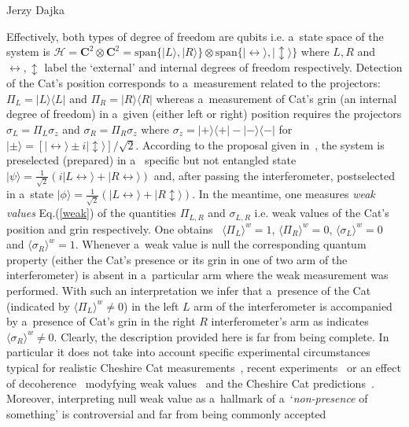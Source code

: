 \begin{artengenv}{Jerzy Dajka}
\begin{figure}
\end{figure}
Effectively, both types of degree of freedom are qubits i.e. a~state space of the  system is
$\mathcal{H}=\mathbf{C}^2\otimes\mathbf{C}^2=\mbox{span}\{|L\rangle,|R\rangle\}\otimes\mbox{span}\{|\leftrightarrow\rangle,|\updownarrow\rangle\}$  
where $L,R$ and $\leftrightarrow,\updownarrow$ label the `external' and internal degrees of freedom respectively. 
Detection of  the Cat's position  corresponds to a~measurement related to the projectors: $\Pi_L=|L\rangle\langle L|$ and $
\Pi_R=|R\rangle\langle R|$
whereas a~measurement of Cat's grin (an internal degree of freedom) in a~given (either left or right) position requires the projectors $\sigma_L = \Pi_L \sigma_z$ and $\sigma_R =  \Pi_R \sigma_z$
where  $\sigma_z=|+\rangle\langle+|-|-\rangle\langle -|$ for $|\pm\rangle=[|\leftrightarrow\rangle \pm i|\updownarrow\rangle]/\sqrt{2}$. 
%
According to the proposal given in~\parencite{cat}, the system is preselected (prepared) in a~ specific but not entangled state
$|\psi\rangle = \frac{1}{\sqrt{2}}\left(i|L\leftrightarrow\rangle +|R \leftrightarrow\rangle\right)$
and, after passing the interferometer,  postselected in a~state
$|\phi\rangle = \frac{1}{\sqrt{2}}\left( |L\leftrightarrow\rangle +|R \updownarrow\rangle\right)$.   
%
In the meantime, one measures {\it weak values} Eq.(\ref{weak}) of the quantities $\Pi_{L,R}$ and $\sigma_{L,R}$ i.e. weak values of the Cat's position and grin respectively. One obtains~\parencite{cat}
$
\langle \Pi_L\rangle^w =1$,
$\langle \Pi_R\rangle^w=0$, 
$\langle \sigma_L\rangle^w =0$ and $\langle \sigma_R\rangle^w=1$. 
% 
Whenever a~weak value is null the corresponding quantum property (either the Cat's presence or its grin in one of two arm of the interferometer) is absent in a~particular arm  where the weak measurement was performed. With such an interpretation we infer that a~presence of the Cat (indicated by $
\langle \Pi_L\rangle^w \neq 0$) in the left $L$ arm of the interferometer is accompanied by a~presence of Cat's grin in the right $R$ interferometer's arm as indicates $\langle \sigma_R\rangle^w\neq 0$. Clearly, the description provided here is far from being complete. In particular it does not take into account specific experimental circumstances typical for realistic Cheshire Cat measurements~\parencite{dup}, recent experiments~\parencite{c2,cat_schlos} or an effect of decoherence~\parencite{schloss} modyfying weak values~\parencite{Shik} and the Cheshire Cat predictions~\parencite{mojkot,mojkot1}. Moreover, interpreting null weak value as a~hallmark of a~`{\it non-presence} of something' is controversial and  far from being commonly accepted  

\end{artengenv}
